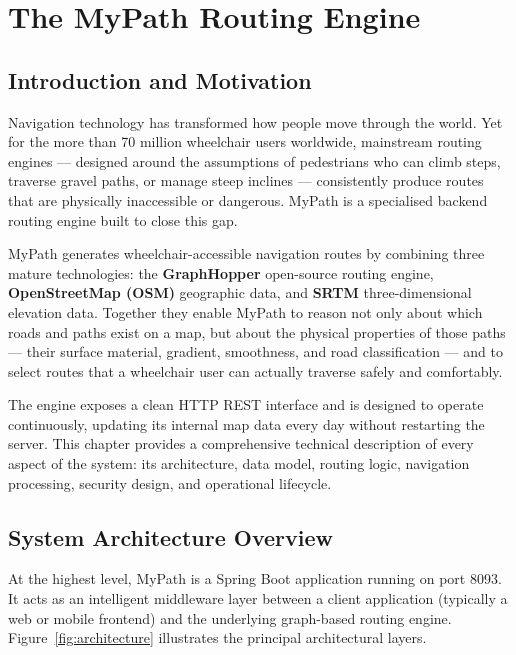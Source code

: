 \documentclass[12pt, a4paper]{report}
\begin{document}
\tableofcontents
\newpage

\chapter{The MyPath Routing Engine}
\label{chap:mypath}

\section{Introduction and Motivation}
\label{sec:intro}

Navigation technology has transformed how people move through the world. Yet for the more than 70 million wheelchair users worldwide, mainstream routing engines — designed around the assumptions of pedestrians who can climb steps, traverse gravel paths, or manage steep inclines — consistently produce routes that are physically inaccessible or dangerous. MyPath is a specialised backend routing engine built to close this gap.

MyPath generates wheelchair-accessible navigation routes by combining three mature technologies: the \textbf{GraphHopper} open-source routing engine, \textbf{OpenStreetMap (OSM)} geographic data, and \textbf{SRTM} three-dimensional elevation data. Together they enable MyPath to reason not only about which roads and paths exist on a map, but about the physical properties of those paths — their surface material, gradient, smoothness, and road classification — and to select routes that a wheelchair user can actually traverse safely and comfortably.

The engine exposes a clean HTTP REST interface and is designed to operate continuously, updating its internal map data every day without restarting the server. This chapter provides a comprehensive technical description of every aspect of the system: its architecture, data model, routing logic, navigation processing, security design, and operational lifecycle.

\section{System Architecture Overview}
\label{sec:architecture}

At the highest level, MyPath is a Spring Boot application running on port 8093. It acts as an intelligent middleware layer between a client application (typically a web or mobile frontend) and the underlying graph-based routing engine. Figure~\ref{fig:architecture} illustrates the principal architectural layers.
\end{document}
